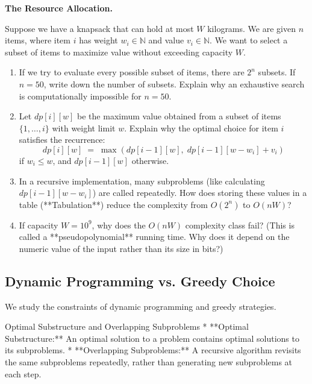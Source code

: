 \documentclass[12pt, a4paper]{book}
\begin{document}
\begin{puzzlebox}
\textbf{The Resource Allocation.}

Suppose we have a knapsack that can hold at most $W$ kilograms.
We are given $n$ items, where item $i$ has weight $w_i \in \mathbb{N}$ and value $v_i \in \mathbb{N}$.
We want to select a subset of items to maximize value without exceeding capacity $W$.
\begin{enumerate}[label=(\alph*), leftmargin=*]
  \item If we try to evaluate every possible subset of items, there are $2^n$ subsets.
        If $n = 50$, write down the number of subsets.
        Explain why an exhaustive search is computationally impossible for $n=50$.
  \item Let $dp[i][w]$ be the maximum value obtained from a subset of items $\{1, \dots, i\}$ with weight limit $w$.
        Explain why the optimal choice for item $i$ satisfies the recurrence:
        \[
          dp[i][w] \;=\; \max\left( dp[i-1][w], \; dp[i-1][w-w_i] + v_i \right)
        \]
        if $w_i \le w$, and $dp[i-1][w]$ otherwise.
  \item In a recursive implementation, many subproblems (like calculating $dp[i-1][w-w_i]$) are called repeatedly.
        How does storing these values in a table (**Tabulation**) reduce the complexity from $O(2^n)$ to $O(n W)$?
  \item If capacity $W = 10^9$, why does the $O(n W)$ complexity class fail? (This is called a **pseudopolynomial** running time. Why does it depend on the numeric value of the input rather than its size in bits?)
\end{enumerate}
\end{puzzlebox}

\subsection{Dynamic Programming vs. Greedy Choice}

We study the constraints of dynamic programming and greedy strategies.

\begin{namedconcept}{Optimal Substructure and Overlapping Subproblems}
* **Optimal Substructure:** An optimal solution to a problem contains optimal solutions to its subproblems.
* **Overlapping Subproblems:** A recursive algorithm revisits the same subproblems repeatedly, rather than generating new subproblems at each step.
\end{namedconcept}
\end{document}
